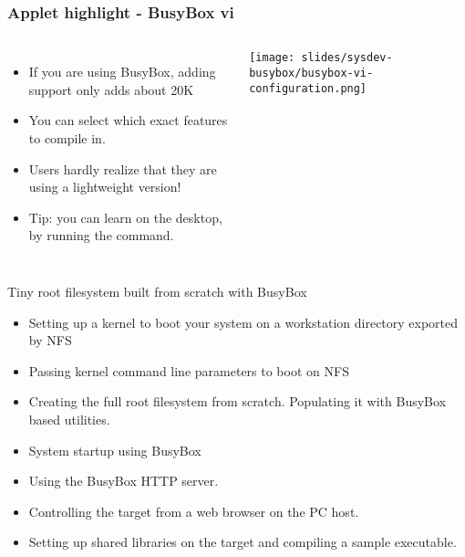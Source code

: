 \begin{frame}
  \frametitle{Applet highlight - BusyBox vi}
  \begin{columns}
      \begin{itemize}
      \item If you are using BusyBox, adding  support only adds
        about 20K
      \item You can select which exact features to compile in.
      \item Users hardly realize that they are using a lightweight 
        version!
      \item Tip: you can learn  on the desktop, by running the 
        command.
      \end{itemize}
      \texttt{[image: slides/sysdev-busybox/busybox-vi-configuration.png]}
  \end{columns}
\end{frame}

\setuplabframe
{Tiny root filesystem built from scratch with BusyBox}
{
  \begin{itemize}
  \item Setting up a kernel to boot your system on a workstation
    directory exported by NFS
  \item Passing kernel command line parameters to boot on NFS
  \item Creating the full root filesystem from scratch.
    Populating it with BusyBox based utilities.
  \item System startup using BusyBox 
  \item Using the BusyBox HTTP server.
  \item Controlling the target from a web browser on the PC host.
  \item Setting up shared libraries on the target and compiling
    a sample executable.
  \end{itemize}
}

